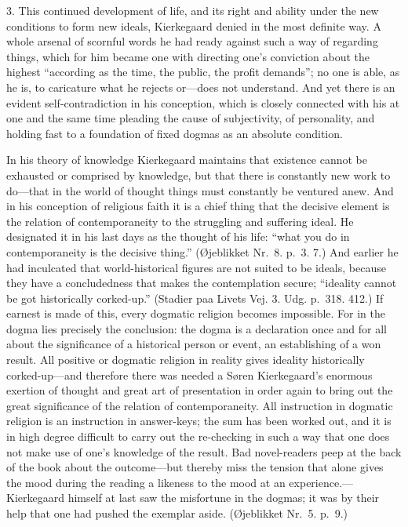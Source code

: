 \documentclass[12pt,a4paper]{book}
\newcommand{\opage}[1]{\marginnote{\footnotesize\textit{[#1]}}}
\begin{document}
3. This continued development of life, and its right and ability under
the new conditions to form new ideals, Kierkegaard denied in the most
definite way. A whole arsenal of scornful words he had ready against such
a way of regarding things, which for him became one with directing one's
conviction about the highest ``according as the time, the public, the
profit demands''; no one is able, as he is, to
\opage{157}caricature what he rejects or---does not understand. And yet
there is an evident self-contradiction in his conception, which is
closely connected with his at one and the same time pleading the cause of
subjectivity, of personality, and holding fast to a foundation of fixed
dogmas as an absolute condition.

In his theory of knowledge Kierkegaard maintains that existence cannot be
exhausted or comprised by knowledge, but that there is constantly new work
to do---that in the world of thought things must constantly be ventured
anew. And in his conception of religious faith it is a chief thing that
the decisive element is the relation of contemporaneity to the struggling
and suffering ideal. He designated it in his last days as the thought of
his life: ``what you do in contemporaneity is the decisive thing.''
(Øjeblikket Nr.~8. p.~3. 7.) And earlier he had inculcated that
world-historical figures are not suited to be ideals, because they have a
concludedness that makes the contemplation secure; ``ideality cannot be
got historically corked-up.'' (Stadier paa Livets Vej. 3. Udg. p.~318.
412.) If earnest is made of this, every dogmatic religion becomes
impossible. For in the dogma lies precisely the conclusion: the dogma is
a declaration once and for all about the significance of a historical
person or event, an establishing of a won result. All positive or
dogmatic religion in reality gives ideality historically corked-up---and
therefore there was needed a Søren Kierkegaard's enormous exertion of
thought and great art of presentation in order again to bring out the
great significance of the relation of contemporaneity. All instruction in
dogmatic religion is an instruction in answer-keys; the sum has been
worked out, and it is in high degree difficult to carry out the
re-checking in such a way that one does not make use of one's knowledge
of the result. Bad novel-readers peep at the back of the book about the
outcome---but thereby miss the tension that alone gives the mood during
the reading a likeness to the mood
\opage{158}at an experience.---Kierkegaard himself at last saw the
misfortune in the dogmas; it was by their help that one had pushed the
exemplar aside. (Øjeblikket Nr.~5. p.~9.)
\end{document}
